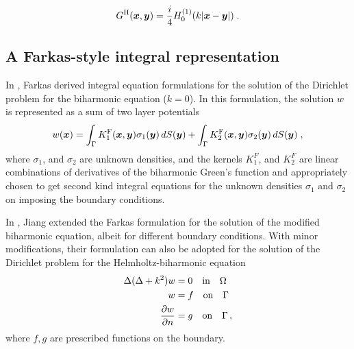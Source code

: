 \begin{equation}
  G^{\textrm{H}}({\boldsymbol x},{\boldsymbol y}) = \frac{i}{4} H_0^{(1)}(k|{\boldsymbol x}-{\boldsymbol y}|) \; .
\end{equation}

\subsection{A Farkas-style integral representation}

In \cite{Farkas89}, Farkas derived integral equation formulations
for the solution of the Dirichlet problem for the biharmonic equation ($k=0$). 
In this formulation, the solution 
$w$ is represented as a sum of two layer potentials
\begin{equation}
  w({\boldsymbol x}) = \int_\Gamma K^{\textrm{F}}_1 ({\boldsymbol x},{\boldsymbol y}) \sigma_1({\boldsymbol y}) \, dS({\boldsymbol y})
  + \int_\Gamma K^{\textrm{F}}_2({\boldsymbol x},{\boldsymbol y}) \sigma_2({\boldsymbol y}) \, dS({\boldsymbol y}) \; ,
  \label{eq:farkRep}
\end{equation}
where $\sigma_{1}$, and $\sigma_{2}$ are unknown densities, and the kernels
$K_{1}^{F}$, and $K_{2}^{F}$ are linear combinations of derivatives of
the biharmonic Green's function and appropriately chosen to get second kind integral equations
for the unknown densities $\sigma_{1}$ and $\sigma_{2}$ on imposing the boundary conditions.

In \cite{jiang2013second}, Jiang extended the Farkas formulation for the solution of the modified
biharmonic equation, albeit for different boundary conditions. With minor modifications, their formulation
can also be adopted for the solution of the Dirichlet problem for the Helmholtz-biharmonic equation
\begin{align}
\Delta (\Delta + k^2) w &= 0 \quad \text{in} \quad \Omega \label{eq:helmbi} \\
w &= f \quad \text{on} \quad \Gamma \\
\frac{\partial w}{\partial n} &=g \quad \text{on} \quad \Gamma \,,
\end{align}
where $f,g$ are prescribed functions on the boundary. 

